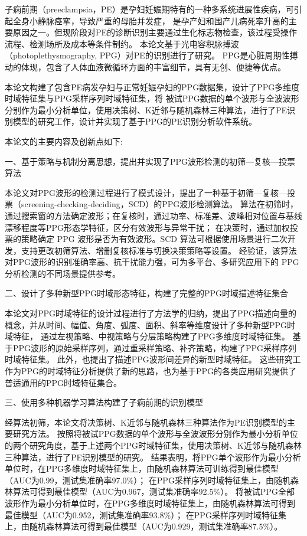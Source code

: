 \cleardoublepage
{}
子痫前期（preeclampsia，PE）是孕妇妊娠期特有的一种多系统进展性疾病，可引起全身小静脉痉挛，导致严重的母胎并发症，
是孕产妇和围产儿病死率升高的主要原因之一。但现阶段对PE的诊断识别主要通过生化标志物检查，该过程受操作流程、检测场所及成本等条件制约。
本论文基于光电容积脉搏波（photoplethysmography, PPG）对PE的识别进行了研究。
PPG是心脏周期性搏动的体现，包含了人体血液微循环方面的丰富细节，具有无创、便捷等优点。

本论文构建了包含PE病发孕妇与正常妊娠孕妇的PPG数据集，设计了PPG多维度时域特征集与PPG采样序列时域特征集，将
被试PPG数据的单个波形与全波波形分别作为最小分析单位，使用决策树、K近邻与随机森林三种算法，进行了PE识别模型的研究工作，设计并实现了基于PPG的PE识别分析软件系统。

本论文的主要内容及创新点如下:

一、基于策略与机制分离思想，提出并实现了PPG波形检测的初筛—复核—投票算法

本论文对PPG波形的检测过程进行了模式设计，提出了一种基于初筛—复核—投票（screening-checking-deciding，SCD）的PPG波形检测算法。
算法在初筛时，通过搜索窗的方法确定波形；在复核时，通过功率、标准差、波峰相对位置与基线漂移程度等PPG形态学特征，区分有效波形与异常干扰；
在决策时，通过加权投票的策略确定 PPG 波形是否为有效波形。SCD 算法可根据使用场景进行二次开发，支持更改初筛算法、增删复核标准与切换决策策略等设置。
经验证，该算法对PPG波形的识别准确率高、抗干扰能力强，可为多平台、多研究应用下的 PPG 分析检测的不同场景提供参考。

二、设计了多种新型PPG时域形态特征，构建了完整的PPG时域描述特征集合

本论文对PPG时域特征的设计过程进行了方法学的归纳，提出了PPG描述向量的概念，并从时间、幅值、角度、弧度、面积、斜率等维度设计了多种新型PPG时域特征，
通过左视策略、中视策略与分层策略构建了PPG多维度时域特征集。
基于PPG波形的原始采样序列，通过重采样策略、补齐策略，构建了PPG采样序列时域特征集。
此外，也提出了描述PPG波形间差异的新型时域特征。
这些研究工作为PPG的时域特征分析提供了新的思路，也为基于PPG的各类应用研究提供了普适通用的PPG时域特征集合。

三、使用多种机器学习算法构建了子痫前期的识别模型

经算法初筛，本论文将决策树、K近邻与随机森林三种算法作为PE识别模型的主要研究方法。
按照将被试PPG数据的单个波形与全波波形分别作为最小分析单位的两个研究角度，基于上述两个PPG时域特征集，使用决策树、K近邻与随机森林三种算法，进行了PE识别模型的研究。
结果表明，将PPG单个波形作为最小分析单位时，在PPG多维度时域特征集上，由随机森林算法可训练得到最佳模型（AUC为0.99，测试集准确率97.0\%）；
在PPG采样序列时域特征集上，由随机森林算法可得到最佳模型（AUC为0.967，测试集准确率92.5\%）。
将被试PPG全部波形作为最小分析单位时，在PPG多维度时域特征集上，由随机森林算法可得到最佳模型（AUC为0.952，测试集准确率93.8\%）；
在PPG采样序列时域特征集上，由随机森林算法可得到最佳模型（AUC为0.929，测试集准确率87.5\%）。

